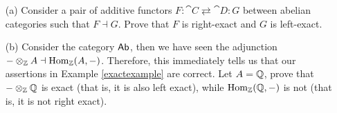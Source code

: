 \vspace*{0.1in}

\begin{problem}\label{prob C.11}\hfill
\begin{itemize}
\item[(a)] Consider a pair of additive functors $F:\cat{C} \rightleftarrows \cat{D}:G$ between abelian categories such that $F \dashv G$. Prove that $F$ is right-exact and $G$ is left-exact.
\item[(b)] Consider the category $\mathsf{Ab}$, then we have seen the adjunction $-\otimes_\mathbb Z A \dashv \mathrm{Hom}_{\mathbb Z}(A,-)$. Therefore, this immediately tells us that our assertions in Example \ref{exactexample} are correct. Let $A = \mathbb Q$, prove that $-\otimes_\mathbb Z \mathbb Q$ is exact (that is, it is also left exact), while $\mathrm{Hom}_{\mathbb Z}(\mathbb Q,-)$ is not (that is, it is not right exact).
\end{itemize}
\end{problem}


















